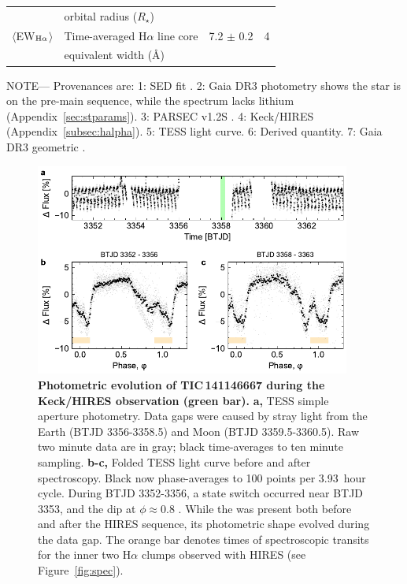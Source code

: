\documentclass[11pt,twocolumn,tighten,linenumbers]{aastex7}
\begin{document}
\begin{table}
\begin{tabular}{llcc}
                                        & \hspace{3pt} orbital radius ($R_\star$)	                       &                      \\
%
$\langle$EW$_{\rm H\alpha}$$\rangle$    & Time-averaged H$\alpha$ line core                              &  7.2 $\pm$ 0.2   & 4 \\ 
                                        & \hspace{3pt} equivalent width (\AA)	                           &                      \\
\hline
\end{tabular}
\begin{flushleft}
\footnotesize{ \textsc{NOTE}---
Provenances are:
1: SED fit \citep{Bouma2024}.
2: Gaia DR3 photometry shows the star is on the pre-main sequence,
   while the spectrum lacks lithium (Appendix~\ref{sec:stparams}).
3: PARSEC v1.2S \citep{Chen2014}.
4: Keck/HIRES (Appendix~\ref{subsec:halpha}).
5: TESS light curve.
6: Derived quantity.
7: Gaia DR3 geometric \citep{GaiaDR3}.
}
\end{flushleft}
\vspace{-0.5cm}
\end{table}

\begin{figure}[!t]
  \centering
  \includegraphics[width=0.925\textwidth]{f2.pdf}
  \vspace{-0.2cm}
  \caption{{\bf Photometric evolution of TIC\,141146667 during the Keck/HIRES
  observation (green bar).}  {\bf a,} TESS simple aperture photometry.
  Data gaps were caused by stray light from the Earth (BTJD 3356-3358.5) and
  Moon (BTJD 3359.5-3360.5).  Raw two minute data are in gray; black
  time-averages to ten minute sampling.  {\bf b-c,} Folded TESS light
  curve before and after spectroscopy.  Black now phase-averages to
  100 points per 3.93\ hour cycle.  During BTJD 3352-3356, a state
  switch occurred near BTJD 3353, and the dip at $\phi$$\approx$0.8
  .  While the  was present both before and after the HIRES
  sequence, its photometric shape evolved during the data gap.  The
  orange bar denotes times of spectroscopic transits for the inner two
  H$\alpha$ clumps observed with HIRES (see Figure~\ref{fig:spec}).}
  \label{fig:fulllc}
\end{figure}
\end{document}
